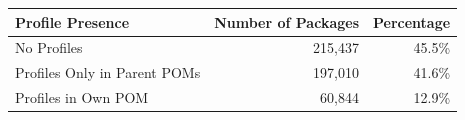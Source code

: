 \small
\begin{tabular}{@{}lrr@{}}
    \toprule
    \textbf{Profile Presence} & \textbf{Number of Packages} & \textbf{Percentage} \\
    \midrule
    No Profiles & 215{,}437 & 45.5\% \\
    Profiles Only in Parent POMs & 197{,}010 & 41.6\% \\
    Profiles in Own POM & 60{,}844 & 12.9\% \\
    \bottomrule
\end{tabular}
